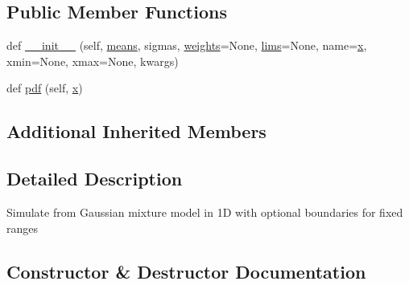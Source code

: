 \subsection*{Public Member Functions}
\begin{DoxyCompactItemize}
\item 
def \mbox{\hyperlink{classgetdist_1_1gaussian__mixtures_1_1Mixture1D_aff5442fcf7a560371b9af3e244fcb605}{\+\_\+\+\_\+init\+\_\+\+\_\+}} (self, \mbox{\hyperlink{classgetdist_1_1gaussian__mixtures_1_1MixtureND_aeee57b3c06a515c91821b09866b52da3}{means}}, sigmas, \mbox{\hyperlink{classgetdist_1_1gaussian__mixtures_1_1MixtureND_a7fbae73d771ec0e1ca1f80558ad3b08b}{weights}}=None, \mbox{\hyperlink{classgetdist_1_1gaussian__mixtures_1_1MixtureND_a0b9e4c4e0b3529e79cfa980507f8d2ea}{lims}}=None, name=\textquotesingle{}\mbox{\hyperlink{plotTT_8m_a9336ebf25087d91c818ee6e9ec29f8c1}{x}}\textquotesingle{}, xmin=None, xmax=None, kwargs)
\item 
def \mbox{\hyperlink{classgetdist_1_1gaussian__mixtures_1_1Mixture1D_a23be258f48e4829421085cccbf568478}{pdf}} (self, \mbox{\hyperlink{plotTT_8m_a9336ebf25087d91c818ee6e9ec29f8c1}{x}})
\end{DoxyCompactItemize}
\subsection*{Additional Inherited Members}


\subsection{Detailed Description}
\begin{DoxyVerb}Simulate from Gaussian mixture model in 1D with optional boundaries for fixed ranges
\end{DoxyVerb}
 

\subsection{Constructor \& Destructor Documentation}
\mbox{\label{classgetdist_1_1gaussian__mixtures_1_1Mixture1D_aff5442fcf7a560371b9af3e244fcb605}} 
